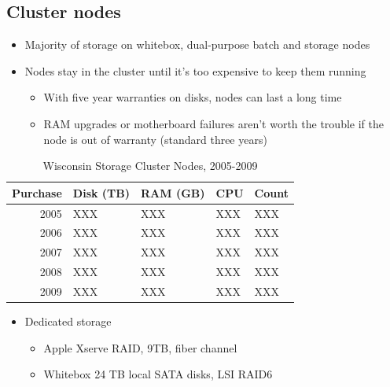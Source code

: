 \documentclass{beamer}
\begin{document}
\subsection{Cluster nodes}
\begin{frame}
\begin{itemize}
	\item Majority of storage on whitebox, dual-purpose batch and storage nodes
	\item Nodes stay in the cluster until it's too expensive to keep them running
	\begin{itemize}
		\item With five year warranties on disks, nodes can last a long time
		\item RAM upgrades or motherboard failures aren't worth the trouble if the node is out of warranty (standard three years)
	\end{itemize}
	\end{itemize}

	\begin{table}
	\begin{tabular}{rllll}
		\toprule
		Purchase	& Disk (TB)	& RAM (GB)	& CPU	& Count	\\
		\midrule
		2005		& XXX		& XXX		& XXX	& XXX	\\ %
		2006		& XXX		& XXX		& XXX	& XXX	\\ %
		2007		& XXX		& XXX		& XXX	& XXX	\\ %
		2008		& XXX		& XXX		& XXX	& XXX	\\ %
		2009		& XXX		& XXX		& XXX	& XXX	\\ %
		\bottomrule
	\end{tabular}
	\caption{Wisconsin Storage Cluster Nodes, 2005-2009}
	\label{cluster_nodes}
	\end{table}

\begin{itemize}
	\item Dedicated storage
	\begin{itemize}
		\item Apple Xserve RAID, 9TB, fiber channel
		\item Whitebox 24 TB local SATA disks, LSI RAID6
	\end{itemize}
\end{itemize}
\end{frame}
\end{document}
